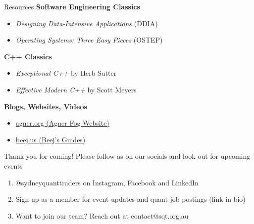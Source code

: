 \begin{frame}{Resources}
  \textbf{Software Engineering Classics}
  \begin{itemize}
    \item \textit{Designing Data-Intensive Applications} (DDIA)
    \item \textit{Operating Systems: Three Easy Pieces} (OSTEP)
  \end{itemize}

  \textbf{C++ Classics}
  \begin{itemize}
    \item \textit{Exceptional C++} by Herb Sutter
    \item \textit{Effective Modern C++} by Scott Meyers
  \end{itemize}

  \textbf{Blogs, Websites, Videos}
  \begin{itemize}
    \item \href{https://agner.org}{agner.org (Agner Fog Website)}
    \item \href{https://beej.us/guide/}{beej.us (Beej's Guides)}
  \end{itemize}
\end{frame}

\begin{frame}{Thank you for coming!}
  Please follow as on our socials and look out for upcoming events 
  \begin{enumerate}
    \item \textcolor{sqt-question}{@sydneyquanttraders} on Instagram, Facebook and LinkedIn
    \item Sign-up as a member for event updates and quant job postings (link in bio)
    \item Want to join our team? Reach out at \textcolor{sqt-question}{contact@sqt.org.au}
  \end{enumerate}
\end{frame}
